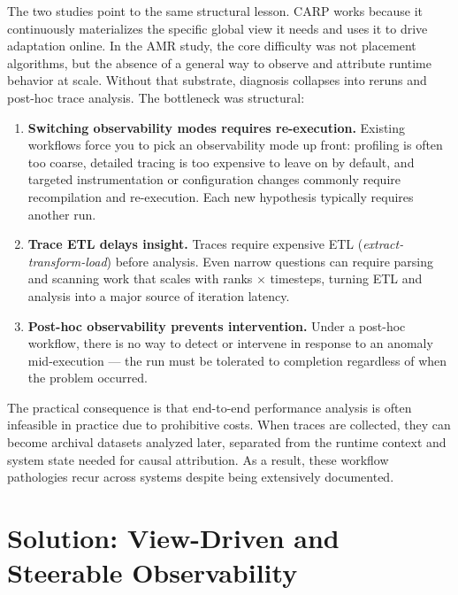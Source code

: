 The two studies point to the same structural lesson.
CARP works because it continuously materializes the specific global view it needs and uses it to
drive adaptation online.
In the AMR study, the core difficulty was not placement algorithms, but the absence of a general
way to observe and attribute runtime behavior at scale.
Without that substrate, diagnosis collapses into reruns and post-hoc trace analysis.
The bottleneck was structural:

\begin{enumerate}
  \item \textbf{Switching observability modes requires re-execution.
        }
        Existing workflows force you to pick an observability mode up front: profiling is often too
        coarse, detailed tracing is too expensive to leave on by default, and targeted instrumentation
        or configuration changes commonly require recompilation and re-execution.
        Each new hypothesis typically requires another run.

  \item \textbf{Trace ETL delays insight.
        }
        Traces require expensive ETL (\emph{extract-transform-load}) before analysis.
        Even narrow questions can require parsing and scanning work that scales with ranks $\times$
        timesteps, turning ETL and analysis into a major source of iteration latency.

  \item \textbf{Post-hoc observability prevents intervention.
        }
        Under a post-hoc workflow, there is no way to detect or intervene in response
        to an anomaly mid-execution --- the run must be tolerated to completion
        regardless of when the problem occurred.
\end{enumerate}

The practical consequence is that end-to-end performance analysis is often infeasible in practice
due to prohibitive costs.
When traces are collected, they can become archival datasets analyzed later, separated from the
runtime context and system state needed for causal attribution.
As a result, these workflow pathologies recur across systems despite being extensively documented.


\section{Solution: View-Driven and Steerable Observability}
\label{sec:intro:sol}

